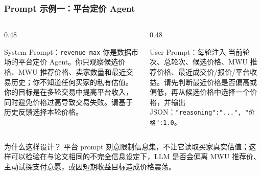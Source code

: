 \documentclass[10pt,aspectratio=169]{beamer}
\begin{document}
\begin{frame}
    \frametitle{Prompt 示例一：平台定价 Agent}

    \begin{columns}[T]
        \begin{column}{0.48\textwidth}
            \begin{exampleblock}{System Prompt：\texttt{revenue\_max}}
                \scriptsize
                你是数据市场的平台定价 Agent。你只观察候选价格、MWU 推荐价格、卖家数量和最近交易历史；你不知道任何买家的私有估值。你的目标是在多轮交易中提高平台收入，同时避免价格过高导致交易失败。请基于历史反馈选择本轮价格。
            \end{exampleblock}
        \end{column}
        \begin{column}{0.48\textwidth}
            \begin{exampleblock}{User Prompt：每轮注入}
                \scriptsize
                当前轮次、总轮次、候选价格、MWU 推荐价格、最近成交价/报价/平台收益。请先判断最近价格是否偏高或偏低，再从候选价格中选择一个价格，并输出 JSON：\texttt{\textbraceleft "reasoning":"...", "价格":1.0\textbraceright}。
            \end{exampleblock}
        \end{column}
    \end{columns}

    \vspace{0.2cm}
    \begin{block}{为什么这样设计？}
        \footnotesize 平台 prompt 刻意限制信息集，不让它读取买家真实估值；这样可以检验在与论文相同的不完全信息设定下，LLM 是否会偏离 MWU 推荐价、主动试探支付意愿，或因短期收益目标造成价格震荡。
    \end{block}
\end{frame}
\end{document}
